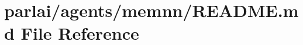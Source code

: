 \hypertarget{parlai_2agents_2memnn_2README_8md}{}\section{parlai/agents/memnn/\+R\+E\+A\+D\+ME.md File Reference}
\label{parlai_2agents_2memnn_2README_8md}
